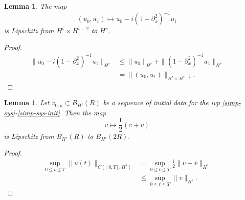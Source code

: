 \documentclass{amsart}
\newtheorem{lemma}[theorem]{Lemma}
\newcommand{\p}{\partial}
\begin{document}
%
%
%
%
%
%
%
%
\begin{lemma}
  The map $$(u_{0}, u_{1}) \mapsto 
  u_{0} - i(1 - \p_{x}^{2})^{-1}u_{1}$$ is Lipschitz from $H^{s} \times
  H^{s-2}$ to $H^{s}$.
\label{lem:lip-init-data}
\end{lemma}
%
%
%
%
\begin{proof}
%
%
\begin{equation*}
\begin{split}
  \| u_{0} - i(1 - \p_{x}^{2})^{-1} u_{1} \|_{H^{s}} 
  & \le \| u_{0} \|_{H^{s}} + \| (1 - \p_{x}^{2})^{-1} u_{1} \|_{H^{s}}
  \\
  & = \| (u_{0}, u_{1}) \|_{H^{s} \times H^{s-2}}.
\end{split}
\end{equation*}
%
%
\end{proof}
%
%
%
%
%
%
%
%
%
%
\begin{lemma}
  Let $v_{0,n} \subset B_{H^{s}}(R)$ be a sequence of initial data for the ivp
  \eqref{simp-sys}-\eqref{simp-sys-init}. Then the map $$v \mapsto
  \frac{1}{2}(v + \bar{v})$$ is Lipschitz from $B_{H^{s}}(R)$ to $B_{H^{s}}(2R)$.
\label{lem:lip-sol}
\end{lemma}
%
%
%
%
\begin{proof}
%
%
\begin{equation*}
\begin{split}
  \sup_{0 \le t \le T} \| u(t) \|_{C\left( [0, T], H^{s} \right)}
  & = \sup_{0 \le t \le T} \frac{1}{2} \| v + \bar v \|_{H^{s}}
  \\
  & \le \sup_{0 \le t \le T} \| v \|_{H^{s}}.
\end{split}
\end{equation*}
%
%
\end{proof}
%
%
\end{document}
